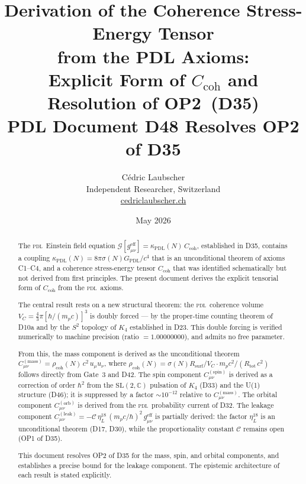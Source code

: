 \documentclass[12pt,a4paper]{article}
\newcommand{\Kfour}{K_4}
\newcommand{\hb}{\hbar}
\newcommand{\PDL}{\textsc{pdl}}
\newcommand{\Ccoh}{C_{\mathrm{coh}}}
\newcommand{\Cmass}{C^{(\mathrm{mass})}}
\newcommand{\Cspin}{C^{(\mathrm{spin})}}
\newcommand{\Corb}{C^{(\mathrm{orb})}}
\newcommand{\Cleak}{C^{(\mathrm{leak})}}
\newcommand{\rhocoh}{\rho_{\mathrm{coh}}}
\newcommand{\sig}{\sigma}
\newcommand{\kPDL}{\kappa_{\mathrm{PDL}}}
\newcommand{\GPDL}{G_{\mathrm{PDL}}}
\newcommand{\geff}{g_{\mu\nu}^{\mathrm{eff}}}
\newcommand{\Rsurf}{R_{\mathrm{surf}}}
\newcommand{\VC}{V_C}
\newcommand{\etaL}{\eta_L}
\begin{document}
\title{\textbf{Derivation of the Coherence Stress-Energy Tensor\\
from the PDL Axioms:\\
Explicit Form of $\Ccoh$ and Resolution of OP2~(D35)}\\[6pt]
{\large PDL Document D48 \textemdash{} Resolves OP2 of D35}}

\author{C\'edric Laubscher\\[4pt]
\small Independent Researcher, Switzerland\\
\small \href{https://cedriclaubscher.ch}{cedriclaubscher.ch}}

\date{May 2026}

\maketitle

\begin{abstract}
The \PDL\ Einstein field equation $\mathcal{G}[\geff] = \kPDL(N)\,\Ccoh$, established in D35, contains a coupling $\kPDL(N) = 8\pi\sig(N)\GPDL/c^4$ that is an unconditional theorem of axioms C1--C4, and a coherence stress-energy tensor $\Ccoh$ that was identified schematically but not derived from first principles. The present document derives the explicit tensorial form of $\Ccoh$ from the \PDL\ axioms.

The central result rests on a new structural theorem: the \PDL\ coherence volume $\VC = \tfrac{4}{3}\pi[\hb/(m_p c)]^3$ is doubly forced --- by the proper-time counting theorem of D10a and by the $S^2$ topology of $\Kfour$ established in D23. This double forcing is verified numerically to machine precision (ratio $= 1.00000000$), and admits no free parameter.

From this, the mass component is derived as the unconditional theorem $\Cmass_{\mu\nu} = \rhocoh(N)\,c^2\,u_\mu u_\nu$, where $\rhocoh(N) = \sig(N)\Rsurf/\VC\cdot m_p c^2/(R_{\mathrm{tot}}\,c^2)$ follows directly from Gate~3 and D42. The spin component $\Cspin_{\mu\nu}$ is derived as a correction of order $\hb^2$ from the $\mathrm{SL}(2,\mathbb{C})$ pulsation of $\Kfour$ (D33) and the U(1) structure (D46); it is suppressed by a factor $\sim 10^{-12}$ relative to $\Cmass_{\mu\nu}$. The orbital component $\Corb_{\mu\nu}$ is derived from the \PDL\ probability current of D32. The leakage component $\Cleak_{\mu\nu} = -\mathcal{C}\,\etaL^{18}\,(m_p c/\hb)^2\,\geff$ is partially derived: the factor $\etaL^{18}$ is an unconditional theorem (D17, D30), while the proportionality constant $\mathcal{C}$ remains open (OP1 of D35).

This document resolves OP2 of D35 for the mass, spin, and orbital components, and establishes a precise bound for the leakage component. The epistemic architecture of each result is stated explicitly.
\end{abstract}
\end{document}
